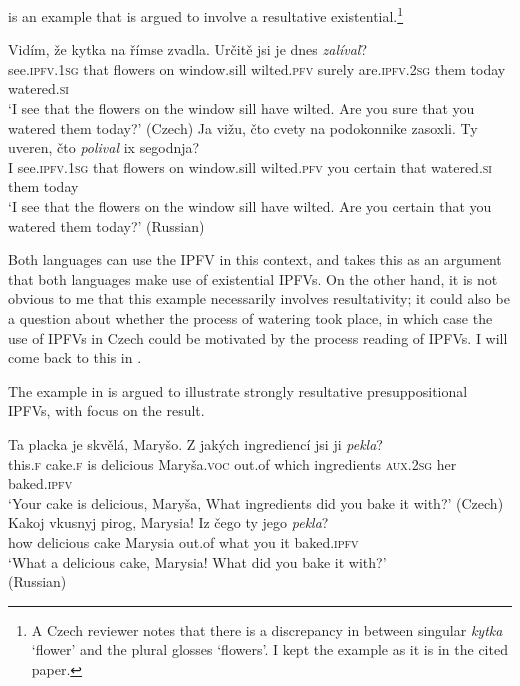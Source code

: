 \documentclass[output=paper,colorlinks,citecolor=brown]{langscibook}
\begin{document}
 \citep[adapted from][16; relevant verb forms italicised]{klimek22} is an example that is argued to involve a resultative existential.\footnote{A Czech reviewer notes that there is a discrepancy in  between singular \textit{kytka} `flower' and the plural glosses `flowers'. I kept the example as it is in the cited paper.}

\ea\label{ex:re}
\ea
\gll Vidím, že kytka na římse zvadla. Určitě jsi je dnes \textit{zalíval}?\\
    see.\textsc{ipfv.1sg} that flowers on window.sill wilted.\textsc{pfv} surely are.\textsc{ipfv.2sg} them today watered.\textsc{si}\\
\glt `I see that the flowers on the window sill have wilted. Are you sure that you watered them today?' \hfill (Czech)\label{ex:rea}
\ex 
\gll Ja vižu, čto cvety na podokonnike zasoxli. Ty uveren, čto \textit{polival} ix segodnja?\\
    I see.\textsc{ipfv.1sg} that flowers on window.sill wilted.\textsc{pfv} you certain that watered.\textsc{si} them today\\
\glt `I see that the flowers on the window sill have wilted. Are you certain that you watered them today?' \hfill (Russian)
\z 
\z 

\noindent Both languages can use the IPFV in this context, and \citeauthor{klimek22} takes this as an argument that both languages make use of existential IPFVs. On the other hand, it is not obvious to me that this example necessarily involves resultativity; it could also be a question about whether the process of watering took place, in which case the use of IPFVs in Czech could be motivated by the process reading of IPFVs. I will come back to this in .

The example in  \citep[adapted from][17]{klimek22} is argued to illustrate strongly resultative presuppositional IPFVs, with focus on the result.

\ea\label{ex:srpfr}
\ea
\gll Ta placka je skvělá, Maryšo. Z jakých ingrediencí jsi ji \textit{pekla}?\\
    this.\textsc{f} cake.\textsc{f} is delicious Maryša.\textsc{voc} out.of which ingredients \textsc{aux.2sg} her baked.\textsc{ipfv}\\
\glt `Your cake is delicious, Maryša, What ingredients did you bake it with?' \hfill (Czech)
\ex 
\gll Kakoj vkusnyj pirog, Marysia! Iz čego ty jego \textit{pekla}?\\
    how delicious cake Marysia out.of what you it baked.\textsc{ipfv}\\
\glt `What a delicious cake, Marysia! What did you bake it with?' \\\hfill (Russian)
\z 
\z 
\end{document}
